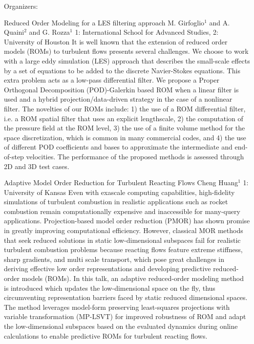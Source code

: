 \label{mini27}

\miniabs
{}
{Organizers: }
{}

\vspace{2ex}
\abs
{Reduced Order Modeling for a LES filtering approach}
{M. Girfoglio$^{1}$ and A. Quaini$^{2}$ and G. Rozza$^{1}$}
{1: International School for Advanced Studies, 2: University of Houston}
{It is well known that the extension of reduced order models (ROMs) to turbulent flows presents several challenges. We choose to work with a large eddy simulation (LES) approach that describes the small-scale effects by a set of equations to be added to the discrete Navier-Stokes equations. This extra problem acts as a low-pass differential filter. We propose a Proper Orthogonal Decomposition (POD)-Galerkin based ROM when a linear filter is used and a hybrid projection/data-driven strategy in the case of a nonlinear filter. The novelties of our ROMs include: 1) the use of a ROM differential filter, i.e. a ROM spatial filter that uses an explicit lengthscale, 2) the computation of the pressure field at the ROM level, 3) the use of a finite volume method for the space discretization, which is common in many commercial codes, and 4) the use of different POD coefficients and bases to approximate the intermediate and end-of-step velocities. The performance of the proposed methods is assessed through 2D and 3D test cases.}


\vspace{1.5ex}
\abs
{Adaptive Model Order Reduction for Turbulent Reacting Flows}
{Cheng Huang$^{1}$}
{1: University of Kansas}
{Even with exascale computing capabilities, high-fidelity simulations of turbulent combustion in realistic applications such as rocket combustion remain computationally expensive and inaccessible for many-query applications. Projection-based model order reduction (PMOR) has shown promise in greatly improving computational efficiency. However, classical MOR methods that seek reduced solutions in static low-dimensional subspaces fail for realistic turbulent combustion problems because reacting flows feature extreme stiffness, sharp gradients, and multi scale transport, which pose great challenges in deriving effective low order representations and developing predictive reduced-order models (ROMs). In this talk, an adaptive reduced-order modeling method is introduced which updates the low-dimensional space on the fly, thus circumventing representation barriers faced by static reduced dimensional spaces. The method leverages model-form preserving least-squares projections with variable transformation (MP-LSVT) for improved robustness of ROM and adapt the low-dimensional subspaces based on the evaluated dynamics during online calculations to enable predictive ROMs for turbulent reacting flows.}


